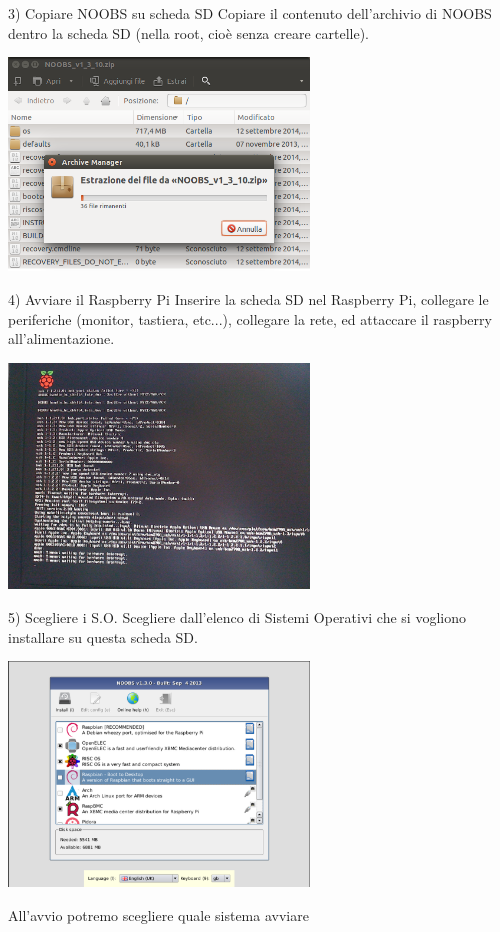 \documentclass[xcolor=svgnames,11pt]{beamer}
\begin{document}
\begin{frame}{3) Copiare NOOBS su scheda SD}
Copiare il contenuto dell'archivio di NOOBS dentro la scheda SD (nella root, cio\`e senza creare cartelle).

\medskip
\begin{center}
\includegraphics[width=8cm]{guide/3.png}
\end{center}
\end{frame}

\begin{frame}{4) Avviare il Raspberry Pi}
Inserire la scheda SD nel Raspberry Pi, collegare le periferiche (monitor, tastiera, etc...), collegare la rete, ed attaccare il raspberry all'alimentazione.

\medskip
\begin{center}
\includegraphics[width=8cm]{guide/4.jpg}
\end{center}
\end{frame}



\begin{frame}{5) Scegliere i S.O.}
Scegliere dall'elenco di Sistemi Operativi che si vogliono installare su questa scheda SD.

\medskip
\begin{center}
\includegraphics[width=8cm]{guide/5.png}
\end{center}

All'avvio potremo scegliere quale sistema avviare

\end{frame}
\end{document}
